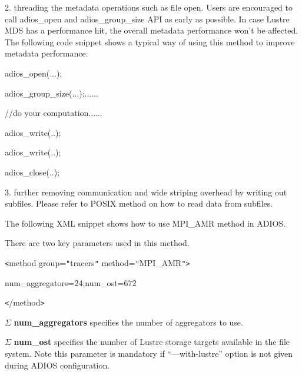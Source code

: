 \vspace{10pt}
2. threading the metadata operations such as file open. Users are encouraged to 
call adios\_open and adios\_group\_size API as early as possible. In case Lustre 
MDS has a performance hit, the overall metadata performance won't be affected. 
The following code snippet shows a typical way of using this method to improve 
metadata performance.

\vspace{22pt}
\leftskip=36pt
adios\_open(...);

\vspace{10pt}
adios\_group\_size(...);......

\vspace{22pt}
//do your computation......

\vspace{22pt}
adios\_write(..);

\vspace{10pt}
adios\_write(..);

\vspace{10pt}
adios\_close(..);

\vspace{22pt}
\leftskip=0pt
3. further removing communication and wide striping overhead by writing out subfiles. 
Please refer to POSIX method on how to read data from subfiles.

\vspace{22pt}
The following XML snippet shows how to use MPI\_AMR method in ADIOS.

\vspace{10pt}
There are two key parameters used in this method.

\vspace{22pt}
\texttt{<}method group=\texttt{"}tracers\texttt{"} method=\texttt{"}MPI\_AMR\texttt{"}\texttt{>}

\vspace{10pt}
\parindent=18pt
num\_aggregators=24;num\_ost=672

\vspace{10pt}
\parindent=0pt
\texttt{<}/method\texttt{>}

\vspace{22pt}
\ensuremath{\Sigma} \textbf{num\_aggregators} specifies the number of aggregators 
to use.

\vspace{10pt}
\ensuremath{\Sigma} \textbf{num\_ost }specifies the number of Lustre storage targets 
 available in the file system. Note this parameter is mandatory if ``---with-lustre'' 
option is not given during ADIOS configuration.

